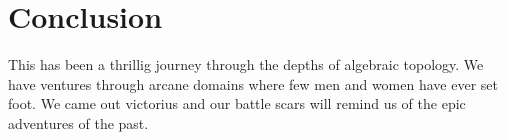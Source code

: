 \chapter{Conclusion}
\label{chapter5}

This has been a thrillig journey through the depths of algebraic topology. We have ventures through arcane domains where few men and women have ever set foot. We came out victorius and our battle scars will remind us of the epic adventures of the past.


